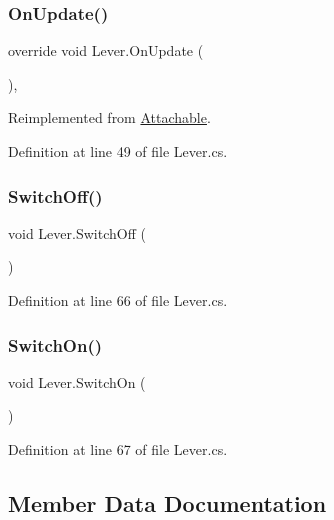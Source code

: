 \subsubsection{\texorpdfstring{On\+Update()}{OnUpdate()}}
{\footnotesize\ttfamily override void Lever.\+On\+Update (\begin{DoxyParamCaption}{ }\end{DoxyParamCaption})\hspace{0.3cm}{\ttfamily [protected]}, {\ttfamily [virtual]}}



Reimplemented from \mbox{\hyperlink{class_attachable_abb659a66efacd6fa09fa1d7125c7b5e6}{Attachable}}.



Definition at line 49 of file Lever.\+cs.

\mbox{\label{class_lever_ad4664a40ec2e5b79f131462cdaffe2e6}} 
\subsubsection{\texorpdfstring{Switch\+Off()}{SwitchOff()}}
{\footnotesize\ttfamily void Lever.\+Switch\+Off (\begin{DoxyParamCaption}{ }\end{DoxyParamCaption})}



Definition at line 66 of file Lever.\+cs.

\mbox{\label{class_lever_a6a6784337a703362735b8aefe6823fc9}} 
\subsubsection{\texorpdfstring{Switch\+On()}{SwitchOn()}}
{\footnotesize\ttfamily void Lever.\+Switch\+On (\begin{DoxyParamCaption}{ }\end{DoxyParamCaption})}



Definition at line 67 of file Lever.\+cs.



\subsection{Member Data Documentation}
\mbox{\label{class_lever_a948c5bd1e0375b4678efc859d8a5c436}} 
